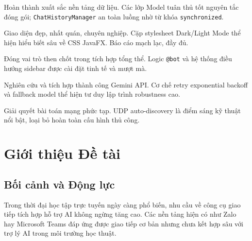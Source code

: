 \documentclass[12pt, a4paper, oneside]{report}
\newcommand{\code}[1]{\texttt{\color{hustblue!80!black}#1}}
\begin{document}
\bigskip
\begin{tcolorbox}[keystyle, title={Nhận xét từng thành viên}]
\begin{description}[leftmargin=0pt, itemsep=6pt]
  \item[\textcolor{hustblue}{Thái Mỹ Anh:}]
    Hoàn thành xuất sắc nền tảng dữ liệu. Các lớp Model tuân thủ tốt
    nguyên tắc đóng gói; \code{ChatHistoryManager} an toàn luồng nhờ từ
    khóa \code{synchronized}.

  \item[\textcolor{hustblue}{Nguyễn Thị Hương Giang:}]
    Giao diện đẹp, nhất quán, chuyên nghiệp. Cặp stylesheet Dark/Light
    Mode thể hiện hiểu biết sâu về CSS JavaFX. Báo cáo mạch lạc, đầy đủ.

  \item[\textcolor{hustblue}{Nguyễn Đình Nam Khánh:}]
    Đóng vai trò then chốt trong tích hợp tổng thể. Logic \code{@bot} và
    hệ thống điều hướng sidebar được cài đặt tinh tế và mượt mà.

  \item[\textcolor{hustblue}{Nguyễn Đức Nam Khánh:}]
    Nghiên cứu và tích hợp thành công Gemini API. Cơ chế retry
    exponential backoff và fallback model thể hiện tư duy lập trình
    robustness cao.

  \item[\textcolor{hustblue}{Trần Đình Tuệ:}]
    Giải quyết bài toán mạng phức tạp. UDP auto-discovery là điểm sáng
    kỹ thuật nổi bật, loại bỏ hoàn toàn cấu hình thủ công.
\end{description}
\end{tcolorbox}

\chapter{Giới thiệu Đề tài}

\section{Bối cảnh và Động lực}

Trong thời đại học tập trực tuyến ngày càng phổ biến, nhu cầu về công
cụ giao tiếp tích hợp hỗ trợ AI không ngừng tăng cao. Các nền tảng hiện
có như Zalo hay Microsoft Teams đáp ứng được giao tiếp cơ bản nhưng chưa
kết hợp sâu với trợ lý AI trong môi trường học thuật.
\end{document}

